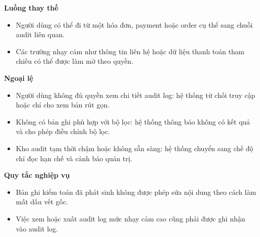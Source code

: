 \documentclass[11pt,a4paper]{article}
\begin{document}
\begin{usecasebox}[title={UC-ADM-03 --- Xem nhật ký kiểm toán và truy vết thao tác nhạy cảm}]
    \textbf{Luồng thay thế}
    \begin{itemize}[leftmargin=1.8em]
  \item Người dùng có thể đi từ một hóa đơn, payment hoặc order cụ thể sang chuỗi audit liên quan.
  \item Các trường nhạy cảm như thông tin liên hệ hoặc dữ liệu thanh toán tham chiếu có thể được làm mờ theo quyền.
\end{itemize}

    \textbf{Ngoại lệ}
    \begin{itemize}[leftmargin=1.8em]
  \item Người dùng không đủ quyền xem chi tiết audit log: hệ thống từ chối truy cập hoặc chỉ cho xem bản rút gọn.
  \item Không có bản ghi phù hợp với bộ lọc: hệ thống thông báo không có kết quả và cho phép điều chỉnh bộ lọc.
  \item Kho audit tạm thời chậm hoặc không sẵn sàng: hệ thống chuyển sang chế độ chỉ đọc hạn chế và cảnh báo quản trị.
\end{itemize}

    \textbf{Quy tắc nghiệp vụ}
    \begin{itemize}[leftmargin=1.8em]
  \item Bản ghi kiểm toán đã phát sinh không được phép sửa nội dung theo cách làm mất dấu vết gốc.
  \item Việc xem hoặc xuất audit log mức nhạy cảm cao cũng phải được ghi nhận vào audit log.
\end{itemize}
    \end{usecasebox}
\end{document}
